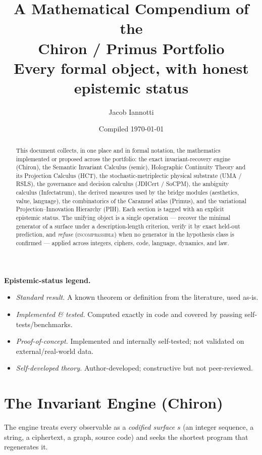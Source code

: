 \documentclass[11pt]{article}
\title{\textbf{A Mathematical Compendium of the\\ Chiron / Primus Portfolio}\\[4pt]
\large Every formal object, with honest epistemic status}
\author{Jacob Iannotti}
\date{Compiled \today}
\theoremstyle{definition}
\theoremstyle{plain}
\theoremstyle{remark}
\begin{document}
\maketitle

\begin{abstract}
This document collects, in one place and in formal notation, the mathematics implemented or
proposed across the portfolio: the exact invariant-recovery engine (Chiron), the Semantic
Invariant Calculus (semic), Holographic Continuity Theory and its Projection Calculus (HCT),
the stochastic-metriplectic physical substrate (UMA / RSLS), the governance and decision
calculus (JDICert / SoCPM), the ambiguity calculus (Infectatrum), the derived measures used by
the bridge modules (aesthetics, value, language), the combinatorics of the Caramuel atlas
(Primus), and the variational Projection--Innovation Hierarchy (PIH). Each section is tagged
with an explicit epistemic status. The unifying object is a single operation --- recover the
minimal generator of a surface under a description-length criterion, verify it by exact
held-out prediction, and \emph{refuse} (\textsc{incompressible}) when no generator in the
hypothesis class is confirmed --- applied across integers, ciphers, code, language, dynamics,
and law.
\end{abstract}

\noindent\textbf{Epistemic-status legend.}
\begin{itemize}
\item \textit{Standard result.} A known theorem or definition from the literature, used as-is.
\item \textit{Implemented \& tested.} Computed exactly in code and covered by passing self-tests/benchmarks.
\item \textit{Proof-of-concept.} Implemented and internally self-tested; not validated on external/real-world data.
\item \textit{Self-developed theory.} Author-developed; constructive but not peer-reviewed.
\end{itemize}

\tableofcontents
\newpage

\section{The Invariant Engine (Chiron)}
The engine treats every observable as a \emph{codified surface} $s$ (an integer sequence, a
string, a ciphertext, a graph, source code) and seeks the shortest program that regenerates it.
\end{document}

